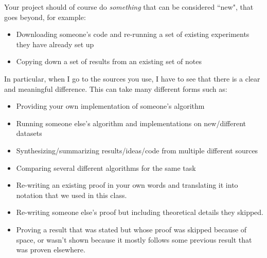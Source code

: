 \documentclass{article}
\begin{document}
	Your project should of course do \emph{something} that can be considered ``new", that goes beyond, for example:
	\begin{itemize}
		\item Downloading someone's code and re-running a set of existing experiments they have already set up
		\item Copying down a set of results from an existing set of notes
	\end{itemize}
	In particular, when I go to the sources you use, I have to see that there is a clear and meaningful difference. This can take many different forms such as:
	\begin{itemize}
		\item Providing your own implementation of someone's algorithm
		\item Running someone else's algorithm and implementations on new/different datasets
		\item Synthesizing/summarizing results/ideas/code from multiple different sources
		\item Comparing several different algorithms for the same task
		\item Re-writing an existing proof in your own words and translating it into notation that we used in this class.
		\item Re-writing someone else's proof but including theoretical details they skipped.
		\item Proving a result that was stated but whose proof was skipped because of space, or wasn't shown because it mostly follows some previous result that was proven elsewhere.
	\end{itemize}
	
\end{document}
